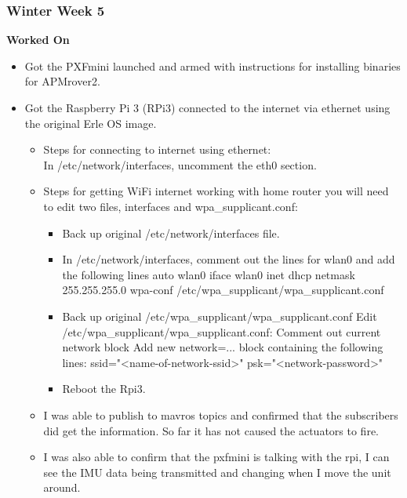 \documentclass[compsoc,draftclsnofoot,onecolumn,10pt]{IEEEtran}
\begin{document}
\subsubsection*{Winter Week 5}
\textbf{Worked On}
\begin{itemize}
    \item Got the PXFmini launched and armed with instructions for installing binaries for APMrover2.
    \item Got the Raspberry Pi 3 (RPi3) connected to the internet via ethernet using the original Erle OS image.
    \begin{itemize}
        \item Steps for connecting to internet using ethernet:\\
        In /etc/network/interfaces, uncomment the eth0 section.
        \item Steps for getting WiFi internet working with home router you will need to edit two files,
        interfaces and wpa\_supplicant.conf:
        \begin{itemize}
            \item Back up original /etc/network/interfaces file.
            \item In /etc/network/interfaces, comment out the lines for wlan0 and add the following lines
                \subitem  auto wlan0
                \subitem iface wlan0 inet dhcp
                \subitem netmask 255.255.255.0
                \subitem wpa-conf /etc/wpa\_supplicant/wpa\_supplicant.conf
            \item Back up original /etc/wpa\_supplicant/wpa\_supplicant.conf
                \subitem Edit /etc/wpa\_supplicant/wpa\_supplicant.conf:
                \subitem Comment out current network block
                \subitem Add new network={...} block containing the following lines:
                \subitem ssid="<name-of-network-ssid>"
                \subitem psk="<network-password>"
            \item Reboot the Rpi3.
        \end{itemize}
    \item I was able to publish to mavros topics and confirmed that the subscribers did get the information. So far it has not caused the actuators to fire.
    \item I was also able to confirm that the pxfmini is talking with the rpi, I can see the IMU data being transmitted and changing when I move the unit around.
    \end{itemize}
\end{itemize}
\end{document}
